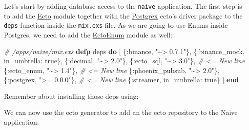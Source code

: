 \documentclass[
]{book}
\newenvironment{Shaded}{\begin{snugshade}}{\end{snugshade}}
\newcommand{\CommentTok}[1]{\textcolor[rgb]{0.56,0.35,0.01}{\textit{#1}}}
\newcommand{\ConstantTok}[1]{\textcolor[rgb]{0.00,0.00,0.00}{#1}}
\newcommand{\ExtensionTok}[1]{#1}
\newcommand{\KeywordTok}[1]{\textcolor[rgb]{0.13,0.29,0.53}{\textbf{#1}}}
\newcommand{\NormalTok}[1]{#1}
\newcommand{\StringTok}[1]{\textcolor[rgb]{0.31,0.60,0.02}{#1}}
\newcommand{\VariableTok}[1]{\textcolor[rgb]{0.00,0.00,0.00}{#1}}
\begin{document}
Let's start by adding database access to the \texttt{naive} application. The first step is to add the \href{https://github.com/elixir-ecto/ecto}{Ecto} module together with the \href{https://github.com/elixir-ecto/postgrex}{Postgrex} ecto's driver package to the \texttt{deps} function inside the \texttt{mix.exs} file. As we are going to use Enums inside Postgres, we need to add the \href{https://github.com/gjaldon/ecto_enum}{EctoEnum} module as well:

\begin{Shaded}
\begin{Highlighting}[]
  \CommentTok{\# /apps/naive/mix.exs}
  \KeywordTok{defp}\NormalTok{ deps }\KeywordTok{do}
\NormalTok{    [}
\NormalTok{      \{}\VariableTok{:binance}\NormalTok{, }\StringTok{"\textasciitilde{}\textgreater{} 0.7.1"}\NormalTok{\},}
\NormalTok{      \{}\VariableTok{:binance\_mock}\NormalTok{, }\VariableTok{in\_umbrella:} \ConstantTok{true}\NormalTok{\},}
\NormalTok{      \{}\VariableTok{:decimal}\NormalTok{, }\StringTok{"\textasciitilde{}\textgreater{} 2.0"}\NormalTok{\},}
\NormalTok{      \{}\VariableTok{:ecto\_sql}\NormalTok{, }\StringTok{"\textasciitilde{}\textgreater{} 3.0"}\NormalTok{\},     }\CommentTok{\# \textless{}= New line}
\NormalTok{      \{}\VariableTok{:ecto\_enum}\NormalTok{, }\StringTok{"\textasciitilde{}\textgreater{} 1.4"}\NormalTok{\},    }\CommentTok{\# \textless{}= New line}
\NormalTok{      \{}\VariableTok{:phoenix\_pubsub}\NormalTok{, }\StringTok{"\textasciitilde{}\textgreater{} 2.0"}\NormalTok{\},}
\NormalTok{      \{}\VariableTok{:postgrex}\NormalTok{, }\StringTok{"\textgreater{}= 0.0.0"}\NormalTok{\},   }\CommentTok{\# \textless{}= New line}
\NormalTok{      \{}\VariableTok{:streamer}\NormalTok{, }\VariableTok{in\_umbrella:} \ConstantTok{true}\NormalTok{\}}
\NormalTok{    ]}
  \KeywordTok{end}
\end{Highlighting}
\end{Shaded}

Remember about installing those deps using:

\begin{Shaded}
\end{Shaded}

We can now use the ecto generator to add an the ecto repository to the Naive application:
\end{document}
